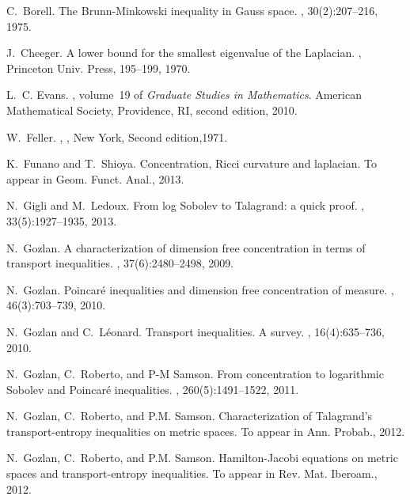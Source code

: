 \documentclass[11pt]{amsart}
\numberwithin{equation}{section}
\begin{document}
\begin{thebibliography}{10}
C.~Borell.
\newblock The {B}runn-{M}inkowski inequality in {G}auss space.
, 30(2):207--216, 1975.

J.~Cheeger.
\newblock A lower bound for the smallest eigenvalue of the {L}aplacian.
,
Princeton Univ. Press,      195--199, 1970.

L.~C. Evans.
, volume~19 of {\em Graduate
  Studies in Mathematics}.
\newblock American Mathematical Society, Providence, RI, second edition, 2010.

W.~Feller.
  ,
,
 {New York},
      { {Second edition},1971}.
    		

K.~Funano and T.~Shioya.
\newblock Concentration, {R}icci curvature and laplacian.
\newblock To appear in Geom. Funct. Anal., 2013.

N.~Gigli and M.~Ledoux.
\newblock From log Sobolev to Talagrand: a quick proof.
, 33(5):1927--1935, 2013.

N.~Gozlan.
\newblock A characterization of dimension free concentration in terms of
  transport inequalities.
, 37(6):2480--2498, 2009.

N.~Gozlan.
\newblock Poincar\'e inequalities and dimension free concentration of measure.
, 46(3):703--739, 2010.

N.~Gozlan and C.~L{\'e}onard.
\newblock Transport inequalities. {A} survey.
, 16(4):635--736, 2010.

N.~Gozlan, C.~Roberto, and P-M Samson.
\newblock From concentration to logarithmic {S}obolev and {P}oincar\'e
  inequalities.
, 260(5):1491--1522, 2011.

N.~Gozlan, C.~Roberto, and P.M. Samson.
\newblock Characterization of {T}alagrand's transport-entropy inequalities on
  metric spaces.
\newblock To appear in Ann. Probab., 2012.

N.~Gozlan, C.~Roberto, and P.M. Samson.
\newblock Hamilton-{J}acobi equations on metric spaces and transport-entropy
  inequalities.
\newblock To appear in Rev. Mat. Iberoam., 2012.


\end{thebibliography}
\end{document}
